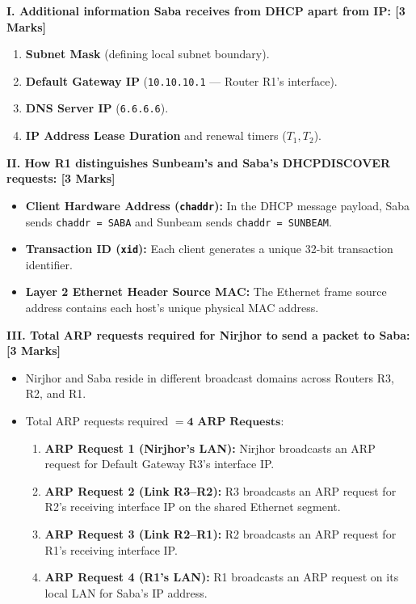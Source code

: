\documentclass[11pt,a4paper]{article}
\begin{document}
\textbf{I. Additional information Saba receives from DHCP apart from IP: [3 Marks]}
\begin{enumerate}
    \item \textbf{Subnet Mask} (defining local subnet boundary).
    \item \textbf{Default Gateway IP} (\texttt{10.10.10.1} --- Router R1's interface).
    \item \textbf{DNS Server IP} (\texttt{6.6.6.6}).
    \item \textbf{IP Address Lease Duration} and renewal timers ($T_1, T_2$).
\end{enumerate}

\textbf{II. How R1 distinguishes Sunbeam's and Saba's DHCPDISCOVER requests: [3 Marks]}
\begin{itemize}
    \item \textbf{Client Hardware Address (\texttt{chaddr}):} In the DHCP message payload, Saba sends \texttt{chaddr = SABA} and Sunbeam sends \texttt{chaddr = SUNBEAM}.
    \item \textbf{Transaction ID (\texttt{xid}):} Each client generates a unique 32-bit transaction identifier.
    \item \textbf{Layer 2 Ethernet Header Source MAC:} The Ethernet frame source address contains each host's unique physical MAC address.
\end{itemize}

\textbf{III. Total ARP requests required for Nirjhor to send a packet to Saba: [3 Marks]}
\begin{itemize}
    \item Nirjhor and Saba reside in different broadcast domains across Routers R3, R2, and R1.
    \item Total ARP requests required $= \mathbf{4\text{ ARP Requests}}$:
    \begin{enumerate}
        \item \textbf{ARP Request 1 (Nirjhor's LAN):} Nirjhor broadcasts an ARP request for Default Gateway R3's interface IP.
        \item \textbf{ARP Request 2 (Link R3--R2):} R3 broadcasts an ARP request for R2's receiving interface IP on the shared Ethernet segment.
        \item \textbf{ARP Request 3 (Link R2--R1):} R2 broadcasts an ARP request for R1's receiving interface IP.
        \item \textbf{ARP Request 4 (R1's LAN):} R1 broadcasts an ARP request on its local LAN for Saba's IP address.
    \end{enumerate}
\end{itemize}
\end{document}
